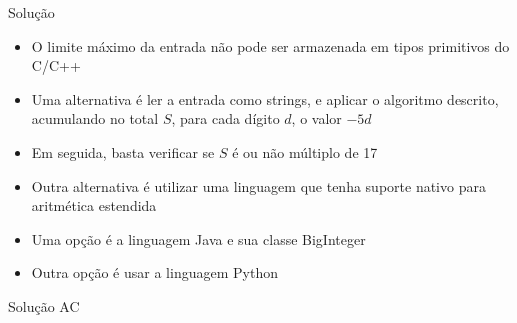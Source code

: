 \begin{frame}[fragile]{Solução}

    \begin{itemize}
        \item O limite máximo da entrada não pode ser armazenada em tipos primitivos do C/C++

        \item Uma alternativa é ler a entrada como strings, e aplicar o algoritmo descrito,
            acumulando no total $S$, para cada dígito $d$, o valor $-5d$

        \item Em seguida, basta verificar se $S$ é ou não múltiplo de 17

        \item Outra alternativa é utilizar uma linguagem que tenha suporte nativo para 
            aritmética estendida 

        \item Uma opção é a linguagem Java e sua classe BigInteger

        \item Outra opção é usar a linguagem Python

   \end{itemize}

\end{frame}

\begin{frame}[fragile]{Solução AC}
\end{frame}
